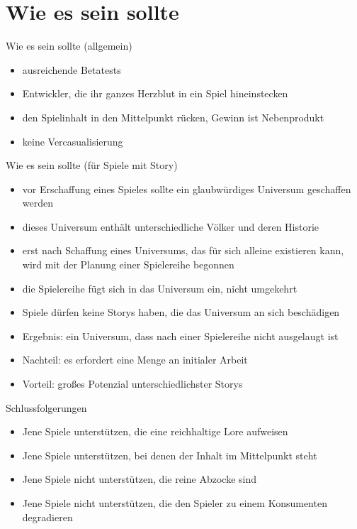 \documentclass{beamer}
\begin{document}
\section{Wie es sein sollte}
\begin{frame}{Wie es sein sollte (allgemein)}
	\begin{itemize}
		\item	ausreichende Betatests
		\item<2->	Entwickler, die ihr ganzes Herzblut in ein Spiel hineinstecken
		\item<3->	den Spielinhalt in den Mittelpunkt rücken, Gewinn ist Nebenprodukt
		\item<4->	keine Vercasualisierung
	\end{itemize}
\end{frame}

\begin{frame}{Wie es sein sollte (für Spiele mit Story)}
	\begin{itemize}
		\item	vor Erschaffung eines Spieles sollte ein glaubwürdiges Universum geschaffen werden
		\item<2->	dieses Universum enthält unterschiedliche Völker und deren Historie
		\item<3->	erst nach Schaffung eines Universums, das für sich alleine existieren kann, wird mit der Planung einer Spielereihe begonnen
		\item<4->	die Spielereihe fügt sich in das Universum ein, nicht umgekehrt
		\item<5->	Spiele dürfen keine Storys haben, die das Universum an sich beschädigen
		\item<6->	Ergebnis: ein Universum, dass nach einer Spielereihe nicht ausgelaugt ist
		\item<7->	Nachteil: es erfordert eine Menge an initialer Arbeit
		\item<7->	Vorteil: großes Potenzial unterschiedlichster Storys
	\end{itemize}
\end{frame}

\begin{frame}{Schlussfolgerungen}
	\begin{itemize}
		\item	Jene Spiele unterstützen, die eine reichhaltige Lore aufweisen
		\item	Jene Spiele unterstützen, bei denen der Inhalt im Mittelpunkt steht
		\item	Jene Spiele nicht unterstützen, die reine Abzocke sind
		\item	Jene Spiele nicht unterstützen, die den Spieler zu einem Konsumenten degradieren
	\end{itemize}
\end{frame}
\end{document}
